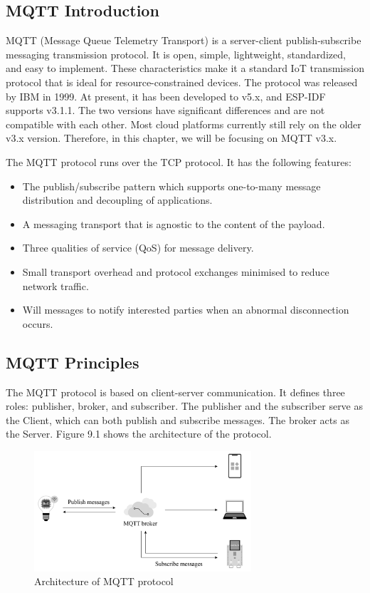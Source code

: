 \documentclass[a4paper,12pt,openany]{book}
\begin{document}
\subsection{MQTT Introduction}
MQTT (Message Queue Telemetry Transport) is a server-client publish-subscribe messaging transmission protocol. It is open, simple, lightweight, standardized, and easy to implement. These characteristics make it a standard IoT transmission protocol that is ideal for resource-constrained devices. The protocol was released by IBM in 1999. At present, it has been developed to v5.x, and ESP-IDF supports v3.1.1. The two versions have significant differences and are not compatible with each other. Most cloud platforms currently still rely on the older v3.x version. Therefore, in this chapter, we will be focusing on MQTT v3.x.

The MQTT protocol runs over the TCP protocol. It has the following features:

\begin{itemize}[noitemsep]
    \item The publish/subscribe pattern which supports one-to-many message distribution and decoupling of applications.
    \item A messaging transport that is agnostic to the content of the payload.
    \item Three qualities of service (QoS) for message delivery.
    \item Small transport overhead and protocol exchanges minimised to reduce network traffic.
    \item Will messages to notify interested parties when an abnormal disconnection occurs.
\end{itemize}

\subsection{MQTT Principles}
The MQTT protocol is based on client-server communication. It defines three roles: publisher, broker, and subscriber. The publisher and the subscriber serve as the Client, which can both publish and subscribe messages. The broker acts as the Server. Figure 9.1 shows the architecture of the protocol.

\begin{figure}[!h]
    \centering
    \includegraphics[width=0.72\textwidth]{D9Z/9-1}
    \caption{Architecture of MQTT protocol}
\end{figure}
\end{document}

